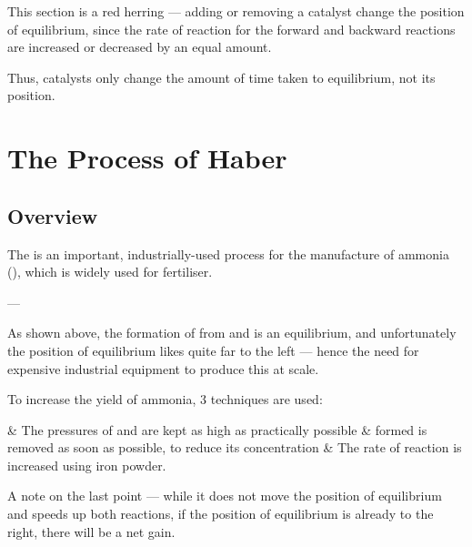			This section is a red herring --- adding or removing a catalyst  change the position of equilibrium, since the
			rate of reaction for  the forward and backward reactions are increased or decreased by an equal amount.

			Thus, catalysts only change the amount of time taken to  equilibrium, not its position.




	\pagebreak
	\section{The Process of Haber}

		\subsection{Overview}

			The  is an important, industrially-used process for the manufacture of ammonia (), which is widely
			used for fertiliser.


			--- 

			As shown above, the formation of  from  and  is an equilibrium, and unfortunately the position of equilibrium
			likes quite far to the left --- hence the need for expensive industrial equipment to produce this at scale.




			To increase the yield of ammonia, 3 techniques are used:


			\begin{bulletlist}
				& The pressures of  and  are kept as high as practically possible
				&  formed is removed as soon as possible, to reduce its concentration
				& The rate of reaction is increased using iron powder.
			\end{bulletlist}

			A note on the last point --- while it does not move the position of equilibrium and speeds up both reactions, if the
			position of equilibrium is already to the right, there will be a net gain.

